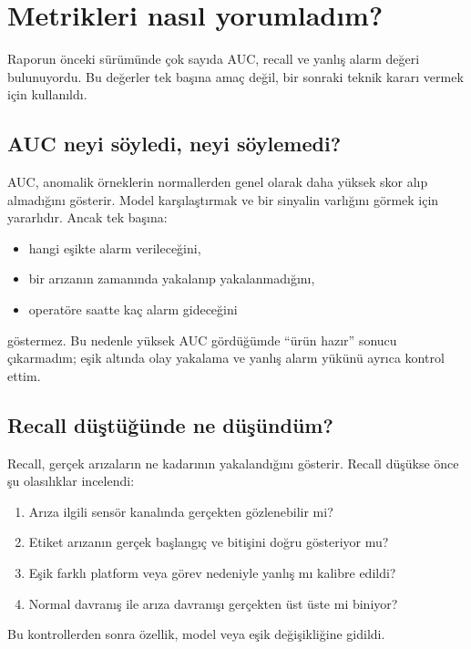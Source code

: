 \documentclass[11pt,a4paper]{article}
\begin{document}
\section{Metrikleri nasıl yorumladım?}

Raporun önceki sürümünde çok sayıda AUC, recall ve yanlış alarm değeri bulunuyordu.
Bu değerler tek başına amaç değil, bir sonraki teknik kararı vermek için kullanıldı.

\subsection{AUC neyi söyledi, neyi söylemedi?}

AUC, anomalik örneklerin normallerden genel olarak daha yüksek skor alıp
almadığını gösterir. Model karşılaştırmak ve bir sinyalin varlığını görmek için
yararlıdır. Ancak tek başına:

\begin{itemize}
  \item hangi eşikte alarm verileceğini,
  \item bir arızanın zamanında yakalanıp yakalanmadığını,
  \item operatöre saatte kaç alarm gideceğini
\end{itemize}

göstermez. Bu nedenle yüksek AUC gördüğümde ``ürün hazır'' sonucu çıkarmadım;
eşik altında olay yakalama ve yanlış alarm yükünü ayrıca kontrol ettim.

\subsection{Recall düştüğünde ne düşündüm?}

Recall, gerçek arızaların ne kadarının yakalandığını gösterir. Recall düşükse
önce şu olasılıklar incelendi:

\begin{enumerate}
  \item Arıza ilgili sensör kanalında gerçekten gözlenebilir mi?
  \item Etiket arızanın gerçek başlangıç ve bitişini doğru gösteriyor mu?
  \item Eşik farklı platform veya görev nedeniyle yanlış mı kalibre edildi?
  \item Normal davranış ile arıza davranışı gerçekten üst üste mi biniyor?
\end{enumerate}

Bu kontrollerden sonra özellik, model veya eşik değişikliğine gidildi.
\end{document}
